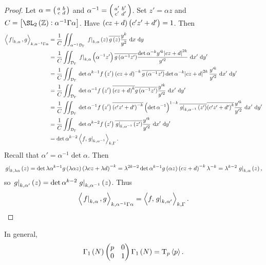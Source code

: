 \begin{proof}
Let $ \alpha = \begin{psmallmatrix} a & b \\ c & d \end{psmallmatrix} $ and $ \alpha^{-1} = \begin{psmallmatrix} a' & b' \\ c' & d' \end{psmallmatrix} $. Set $ z' = \alpha z $ and $ C = \sbr{\SL_2\br{\ZZ} : \alpha^{-1}\Gamma\alpha} $. Have $ \br{cz + d}\br{c'z' + d'} = 1 $. Then
\begin{align*}
\abr{\eval{f}_{k, \alpha}, g}_{k, \alpha^{-1}\Gamma\alpha}
& = \dfrac{1}{C}\iintd{\alpha^{-1}\DDD_\Gamma}{\eval{f}_{k, \alpha}\br{z}\overline{g\br{z}}\dfrac{y^k}{y^2}}{x}{y} \\
& = \dfrac{1}{C}\iintd{\DDD_\Gamma}{\eval{f}_{k, \alpha}\br{\alpha^{-1}z'}\overline{g\br{\alpha^{-1}z'}}\dfrac{\det \alpha^{-k}y'^k\abs{cz + d}^{2k}}{y'^2}}{x'}{y'} \\
& = \dfrac{1}{C}\iintd{\DDD_\Gamma}{\det \alpha^{k - 1}f\br{z'}\br{cz + d}^{-k}\overline{g\br{\alpha^{-1}z'}}\det \alpha^{-k}\abs{cz + d}^{2k}\dfrac{y'^k}{y'^2}}{x'}{y'} \\
& = \dfrac{1}{C}\iintd{\DDD_\Gamma}{\det \alpha^{-1}f\br{z'}\overline{\br{cz + d}^k}\overline{g\br{\alpha^{-1}z'}}\dfrac{y'^k}{y'^2}}{x'}{y'} \\
& = \dfrac{1}{C}\iintd{\DDD_\Gamma}{\det \alpha^{-1}f\br{z'}\overline{\br{c'z' + d'}^{-k}}\br{\det \alpha^{-1}}^{1 - k}\overline{\eval{g}_{k, \alpha^{-1}}\br{z'}}\overline{\br{c'z' + d'}^k}\dfrac{y'^k}{y'^2}}{x'}{y'} \\
& = \dfrac{1}{C}\iintd{\DDD_\Gamma}{\det \alpha^{k - 2}f\br{z'}\overline{\eval{g}_{k, \alpha^{-1}}\br{z'}}\dfrac{y'^k}{y'^2}}{x'}{y'} \\
& = \det \alpha^{k - 2}\abr{f, \eval{g}_{k, \alpha^{-1}}}_{k, \Gamma}.
\end{align*}
Recall that $ \alpha' = \alpha^{-1}\det \alpha $. Then
$$ \eval{g}_{k, \lambda\alpha}\br{z} = \det \lambda\alpha^{k - 1}g\br{\lambda\alpha z}\br{\lambda cz + \lambda d}^{-k} = \lambda^{2k - 2}\det \alpha^{k - 1}g\br{\alpha z}\br{cz + d}^{-k}\lambda^{-k} = \lambda^{k - 2}\eval{g}_{k, \alpha}\br{z}, $$
so $ \eval{g}_{k, \alpha'}\br{z} = \det \alpha^{k - 2}\eval{g}_{k, \alpha^{-1}}\br{z} $. Thus
$$ \left\langle \left. f \right|_{k, \alpha}, g \right\rangle_{k, \alpha^{-1}\Gamma\alpha} = \left\langle f, \left. g \right|_{k, \alpha'} \right\rangle_{k, \Gamma}. $$
\end{proof}


\begin{proposition}
In general,
$$ \Gamma_1\br{N}\twobytwo{p}{0}{0}{1}\Gamma_1\br{N} = \T_p\abr{p}. $$
\end{proposition}

